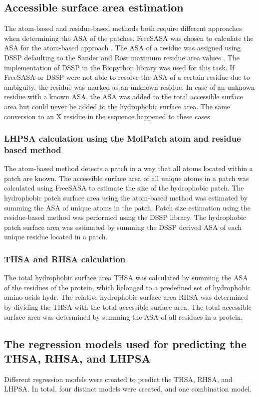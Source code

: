 \documentclass[11pt,a4paper]{article}
\begin{document}
\subsection{Accessible surface area estimation}
The atom-based and residue-based methods both require different approaches when determining the ASA of the patches. FreeSASA was chosen to calculate the ASA for the atom-based approach \cite{mitternacht2016freesasa}. The ASA of a residue was assigned using DSSP \cite{kabsch1983dictionary} defaulting to the Sander and Rost maximum residue area values \cite{rost1994conservation}. The implementation of DSSP in the Biopython library was used for this task. If FreeSASA or DSSP were not able to resolve the ASA of a certain residue due to ambiguity, the residue was marked as an unknown residue. In case of an unknown residue with a known ASA, the ASA was added to the total accessible surface area but could never be added to the hydrophobic surface area. The same conversion to an X residue in the sequence happened to these cases.

\subsubsection{LHPSA calculation using the MolPatch atom and residue based method}
The atom-based method detects a patch in a way that all atoms located within a patch are known. The accessible surface area of all unique atoms in a patch was calculated using FreeSASA to estimate the size of the hydrophobic patch. The hydrophobic patch surface area using the atom-based method was estimated by summing the ASA of unique atoms in the patch. Patch size estimation using the residue-based method was performed using the DSSP library. The hydrophobic patch surface area was estimated by summing the DSSP derived ASA of each unique residue located in a patch. 

\subsubsection{THSA and RHSA calculation}
The total hydrophobic surface area THSA was calculated by summing the ASA of the residues of the protein, which belonged to a predefined set of hydrophobic amino acids hydr. The relative hydrophobic surface area RHSA was determined by dividing the THSA with the total accessible surface area. The total accessible surface area was determined by summing the ASA of all residues in a protein.

\subsection{The regression models used for predicting the THSA, RHSA, and LHPSA}
Different regression models were created to predict the THSA, RHSA, and LHPSA. In total, four distinct models were created, and one combination model.
\end{document}
